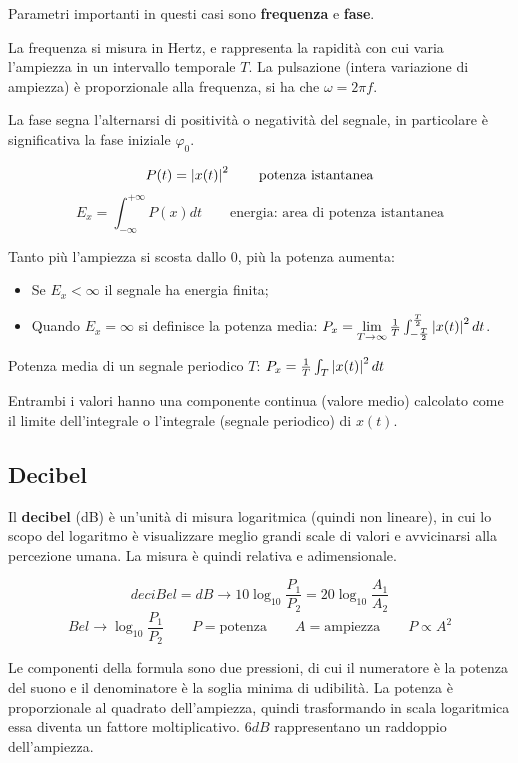 Parametri importanti in questi casi sono \textbf{frequenza} e \textbf{fase}. 

La frequenza si misura in Hertz, e rappresenta la rapidità con cui varia l'ampiezza in un intervallo temporale $T$. La pulsazione (intera variazione di ampiezza) è proporzionale alla frequenza, si ha che $\omega = 2\pi f$. 

La fase segna l'alternarsi di positività o negatività del segnale, in particolare è significativa la fase iniziale $\varphi_0$.

$$P(t) = \left|x(t)\right|^2 \qquad \text{potenza istantanea}$$
$$E_x = \int_{-\infty}^{+\infty} P(x) dt \qquad \text{energia: area di potenza istantanea}$$

Tanto più l'ampiezza si scosta dallo 0, più la potenza aumenta:
\begin{itemize}
	\item Se $E_x < \infty$ il segnale ha energia finita;
	\item Quando $E_x = \infty$ si definisce la potenza media: $P_x = \lim\limits_{T \rightarrow \infty} \frac{1}{T} \int_{-\frac{T}{2}}^{\frac{T}{2}} \left|x(t)\right|^2 dt$.
\end{itemize}
Potenza media di un segnale periodico $T$: $P_x = \frac{1}{T} \int_{T} \left|x(t)\right|^2 dt$

Entrambi i valori hanno una componente continua (valore medio) calcolato come il limite dell'integrale o l'integrale (segnale periodico) di $x(t)$.

\subsection{Decibel}
Il \textbf{decibel} (dB) è un'unità di misura logaritmica (quindi non lineare), in cui lo scopo del logaritmo è visualizzare meglio grandi scale di valori e avvicinarsi alla percezione umana. La misura è quindi relativa e adimensionale.

$$deciBel = dB \longrightarrow 10\log_{10} \frac{P_1}{P_2} = 20\log_{10} \frac{A_1}{A_2}$$
$$ Bel \longrightarrow \log_{10} \frac{P_1}{P_2} \qquad P = \text{potenza} \qquad A = \text{ampiezza} \qquad P \propto A^2$$

Le componenti della formula sono due pressioni, di cui il numeratore è la potenza del suono e il denominatore è la soglia minima di udibilità. La potenza è proporzionale al quadrato dell'ampiezza, quindi trasformando in scala logaritmica essa diventa un fattore moltiplicativo. $6dB$ rappresentano un raddoppio dell'ampiezza.


